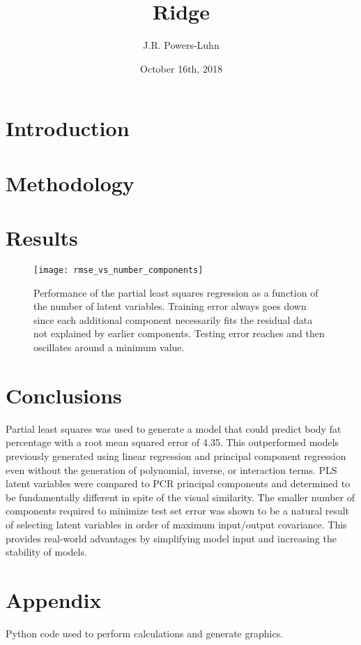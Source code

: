 \documentclass{IEEEtran}
\author{J.R. Powers-Luhn}
\title{Ridge}
\date{October 16th, 2018}
\begin{document}
\maketitle

\begin{abstract}

\end{abstract}

\section{Introduction}

\section{Methodology}

\section{Results}

\begin{centering}
\begin{figure}
\centering
\begin{center}
	\texttt{[image: rmse\_vs\_number\_components]}
	\caption{Performance of the partial least squares regression as a function of the number of latent variables. Training error always goes down since each additional component necessarily fits the residual data not explained by earlier components. Testing error reaches and then oscillates around a minimum value.\label{fig:rmse_vs_number_components}}
\end{center}
\end{figure}
\end{centering}

\section{Conclusions}

Partial least squares was used to generate a model that could predict body fat percentage with a root mean squared error of \num{4.35}. This outperformed models previously generated using linear regression and principal component regression even without the generation of polynomial, inverse, or interaction terms. PLS latent variables were compared to PCR principal components and determined to be fundamentally different in spite of the visual similarity. The smaller number of components required to minimize test set error was shown to be a natural result of selecting latent variables in order of maximum input/output covariance. This provides real-world advantages by simplifying model input and increasing the stability of models.

\printbibliography

\onecolumn
\section{Appendix}
Python code used to perform calculations and generate graphics.
\lstset{frame=single}

\end{document}
